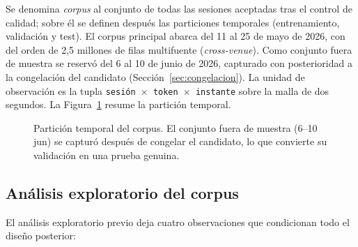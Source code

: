 Se denomina \emph{corpus} al conjunto de todas las sesiones aceptadas tras el control de
calidad; sobre él se definen después las particiones temporales (entrenamiento, validación y
test). El corpus principal abarca del 11 al 25 de mayo de 2026, con del orden de 2,5 millones
de filas multifuente (\emph{cross-venue}). Como conjunto fuera
de muestra se reservó del 6 al 10 de junio de 2026, capturado con posterioridad a la
congelación del candidato (Sección~\ref{sec:congelacion}). La unidad de observación es la
tupla \texttt{sesión $\times$ token $\times$ instante} sobre la malla de dos segundos. La
Figura~\ref{fig:timeline} resume la partición temporal.

\begin{figure}[h]
\centering
{}
\caption{Partición temporal del corpus. El conjunto fuera de muestra (6--10 jun) se capturó
después de congelar el candidato, lo que convierte su validación en una prueba genuina.}
\label{fig:timeline}
\end{figure}

\subsection{Análisis exploratorio del corpus}
\label{sec::eda_corpus}

El análisis exploratorio previo deja cuatro observaciones que condicionan todo el diseño
posterior:

